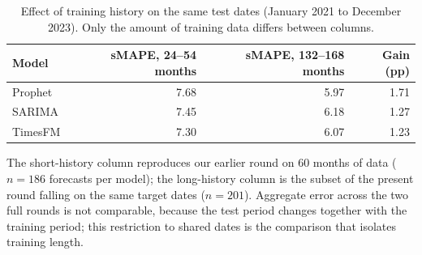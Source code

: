 \begin{table}[htbp]
\centering
\small
\caption{Effect of training history on the same test dates (January 2021 to December
2023). Only the amount of training data differs between columns.}
\label{tab:serie}
\begin{tabular}{lrrr}
\toprule
Model & sMAPE, 24--54 months & sMAPE, 132--168 months & Gain (pp) \\
\midrule
Prophet & 7.68 & 5.97 & 1.71 \\
SARIMA & 7.45 & 6.18 & 1.27 \\
TimesFM & 7.30 & 6.07 & 1.23 \\
\bottomrule
\end{tabular}

\vspace{0.5em}
\begin{minipage}{\textwidth}
\footnotesize
The short-history column reproduces our earlier round on 60 months of data
($n=186$ forecasts per model); the long-history column is
the subset of the present round falling on the same target dates
($n=201$). Aggregate error across the two full rounds is
not comparable, because the test period changes together with the training period; this
restriction to shared dates is the comparison that isolates training length.
\end{minipage}
\end{table}
